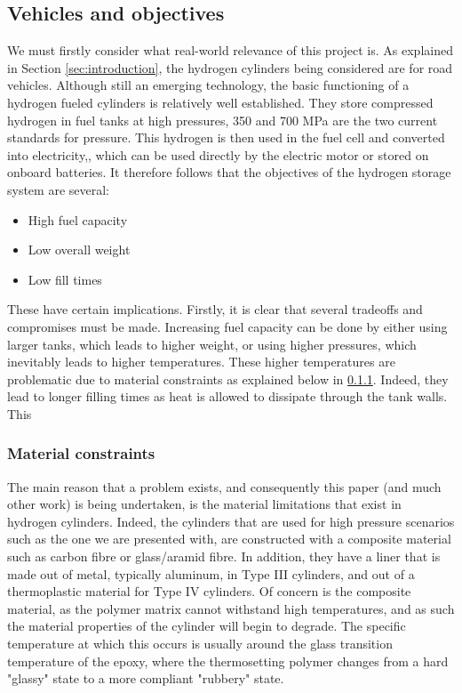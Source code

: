 


\subsection{Vehicles and objectives}

We must firstly consider what real-world relevance of this project is. As explained in Section \ref{sec:introduction}, the hydrogen cylinders being considered are for road vehicles.  Although still an emerging technology, the basic functioning of a hydrogen fueled cylinders is relatively well established. They store compressed hydrogen in fuel tanks at high pressures, 350 and 700 MPa are the two current standards  for pressure. This hydrogen is then used in the fuel cell and converted into electricity,, which can be used directly by the electric motor or stored on onboard batteries. It therefore follows that the objectives of the hydrogen storage system are several:

\begin{itemize}
\item High fuel capacity
\item Low overall weight
\item Low fill times
\end{itemize}
These have certain implications. Firstly, it is clear that several tradeoffs and compromises must be made. Increasing fuel capacity can be done by either using larger tanks, which leads to higher weight, or using higher pressures, which inevitably leads to higher temperatures. These higher temperatures are problematic due to material constraints as explained below in \cref{sec:materialConstraints}. Indeed, they lead to longer filling times as heat is allowed to dissipate through the tank walls. This 

\subsubsection{Material constraints}
\label{sec:materialConstraints}
The main reason that a problem exists, and consequently this paper (and much other work) is being undertaken, is the material limitations that exist in hydrogen cylinders. Indeed, the cylinders that are used for high pressure scenarios such as the one we are presented with, are constructed with a composite material such as carbon fibre or glass/aramid fibre. In addition, they have a liner that is made out of metal, typically aluminum, in Type III cylinders, and out of a thermoplastic material for Type IV cylinders. Of concern is the composite material, as the polymer matrix cannot withstand high temperatures, and as such the material properties of the cylinder will begin to degrade. The specific temperature at which this occurs is usually around the glass transition temperature of the epoxy, where the thermosetting polymer changes from a hard "glassy" state to a more compliant "rubbery" state.  

